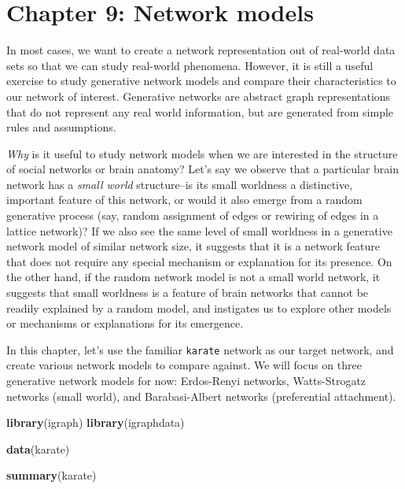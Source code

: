 \documentclass[
]{book}
\newenvironment{Shaded}{\begin{snugshade}}{\end{snugshade}}
\newcommand{\FunctionTok}[1]{\textcolor[rgb]{0.13,0.29,0.53}{\textbf{#1}}}
\newcommand{\NormalTok}[1]{#1}
\newcommand{\StringTok}[1]{\textcolor[rgb]{0.31,0.60,0.02}{#1}}
\begin{document}
\chapter{Chapter 9: Network models}\label{ch9}

In most cases, we want to create a network representation out of real-world data sets so that we can study real-world phenomena. However, it is still a useful exercise to study generative network models and compare their characteristics to our network of interest. Generative networks are abstract graph representations that do not represent any real world information, but are generated from simple rules and assumptions.

\emph{Why} is it useful to study network models when we are interested in the structure of social networks or brain anatomy? Let's say we observe that a particular brain network has a \emph{small world} structure--is its small worldness a distinctive, important feature of this network, or would it also emerge from a random generative process (say, random assignment of edges or rewiring of edges in a lattice network)? If we also see the same level of small worldness in a generative network model of similar network size, it suggests that it is a network feature that does not require any special mechanism or explanation for its presence. On the other hand, if the random network model is not a small world network, it suggests that small worldness is a feature of brain networks that cannot be readily explained by a random model, and instigates us to explore other models or mechanisms or explanations for its emergence.

In this chapter, let's use the familiar \texttt{karate} network as our target network, and create various network models to compare against. We will focus on three generative network models for now: Erdos-Renyi networks, Watts-Strogatz networks (small world), and Barabasi-Albert networks (preferential attachment).

\begin{Shaded}
\begin{Highlighting}[]
\FunctionTok{library}\NormalTok{(igraph)}
\FunctionTok{library}\NormalTok{(igraphdata)}

\FunctionTok{data}\NormalTok{(}\StringTok{\textquotesingle{}karate\textquotesingle{}}\NormalTok{)}

\FunctionTok{summary}\NormalTok{(karate)}
\end{Highlighting}
\end{Shaded}
\end{document}
